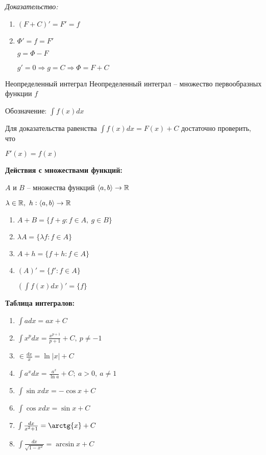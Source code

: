\documentclass[12pt]{article}
\newcommand{\q}[1]{\langle #1 \rangle}
\begin{document}
\textit{Доказательство:}

\begin{enumerate}
    \item $(F + C)' = F' = f$
    \item $\Phi' = f = F'$
    
    $g = \Phi - F$

    $g' = 0 \Rightarrow g = C \Rightarrow \Phi = F + C$
\end{enumerate}

\begin{defin}{Неопределенный интеграл}
    Неопределенный интеграл -- множество первообразных функции $f$

    Обозначение: $\int f(x)dx$
\end{defin}

\begin{Remark}{}
    Для доказательства равенства $\int f(x)dx = F(x) + C$ достаточно проверить, что 
    
    $F'(x) = f(x)$
\end{Remark}

\textbf{Действия с множествами функций:}

$A$ и $B$ -- множества функций $\q{a, b} \rightarrow \R$

$\lambda \in \R,\ h : \q{a, b} \rightarrow \R$

\begin{enumerate}
    \item $A + B = \{f + g : f \in A,\ g \in B\}$
    \item $\lambda A = \{\lambda f : f \in A\}$
    \item $A + h = \{f + h : f \in A\}$
    \item $(A)' = \{f' : f \in A\}$
    
    \begin{Example}{}
        $(\int f(x)dx)' = \{ f \}$
    \end{Example}
\end{enumerate}

\textbf{Таблица интегралов:}

\begin{enumerate}
    \item $\int adx = ax + C$
    \item $\int x^pdx = \frac{x^{p + 1}}{p + 1} + C,\ p \neq -1$
    \item $\in \frac{dx}{x} = \ln{|x|} + C$
    \item $\int a^xdx = \frac{a^x}{\ln{a}} + C;\ a > 0,\ a \neq 1$
    \item $\int \sin{x}dx = -\cos{x} + C$
    \item $\int \cos{x}dx = \sin{x} + C$
    \item $\int \frac{dx}{x^2 + 1} = \arctg{x} + C$
    \item $\int \frac{dx}{\sqrt{1 - x^2}} = \arcsin{x} + C$
\end{enumerate}
\end{document}
